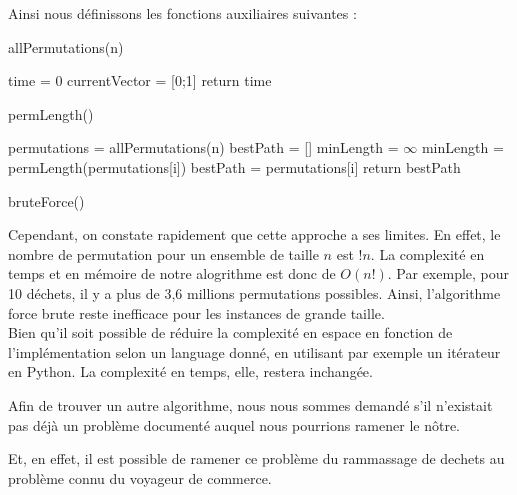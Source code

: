 \documentclass{report}
\begin{document}
Ainsi nous définissons les fonctions auxiliaires suivantes : \\

\begin{algorithm}
  \SetAlgoLined
  \caption{allPermutations(n)}
\end{algorithm}

\begin{algorithm}
    \SetAlgoLined
    time = 0\;
    currentVector = [0;1]\;
    return time\;
    \caption{permLength()}
  \end{algorithm}

  \begin{algorithm}[H]
    \SetAlgoLined
    permutations = allPermutations(n)\;
    bestPath = []\;
    minLength = $\infty$ \;
    {
        {
            minLength = permLength(permutations[i])\;
            bestPath = permutations[i]\;
        }
    }
    return bestPath\;
    \caption{bruteForce()}
  \end{algorithm}

  Cependant, on constate rapidement que cette approche a ses limites. En effet, le nombre de permutation pour un ensemble de taille $n$ est $!n$. La complexité en temps et en mémoire de notre alogrithme est donc de $O(n!)$.
  Par exemple, pour 10 d\'echets, il y a plus de 3,6 millions permutations possibles. Ainsi, l'algorithme force brute reste inefficace pour les instances de grande taille. \\


  Bien qu'il soit possible de réduire la complexité en espace en fonction de l'implémentation selon un language donné, en utilisant par exemple un itérateur en Python. La complexité en temps, elle, restera inchangée.

  Afin de trouver un autre algorithme, nous nous sommes demandé s'il n'existait pas déjà un problème documenté auquel nous pourrions ramener le nôtre.

  Et, en effet, il est possible de ramener ce problème du rammassage de dechets au problème connu du voyageur de commerce.
\end{document}
